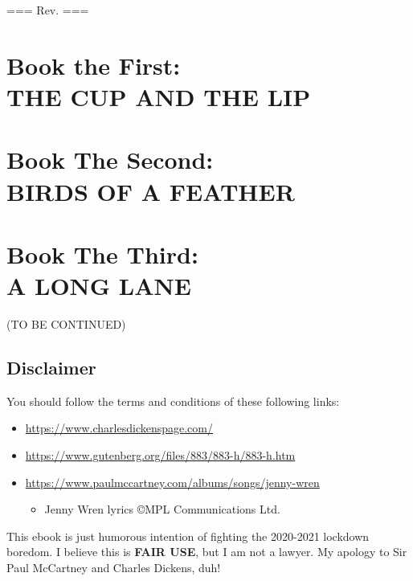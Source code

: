 \documentclass[12pt]{book}
\begin{document}
\noindent
=== Rev. \rev ===

\newpage


\part{Book the First:\\THE CUP AND THE LIP}



















\part{Book The Second:\\BIRDS OF A FEATHER}










\part{Book The Third:\\A LONG LANE}





{\LARGE (TO BE CONTINUED)}

\chapter*{Disclaimer}

You should follow the terms and conditions of these following links:
\begin{itemize}
\item \url{https://www.charlesdickenspage.com/}
\item \url{https://www.gutenberg.org/files/883/883-h/883-h.htm}
\item \url{https://www.paulmccartney.com/albums/songs/jenny-wren}
\begin{itemize}
\item Jenny Wren lyrics \copyright MPL Communications Ltd.
\end{itemize}
\end{itemize}

\noindent
This ebook is just humorous intention of fighting the 2020-2021 lockdown boredom.
I believe this is \textbf{FAIR USE}, but I am not a lawyer.
My apology to Sir Paul McCartney and Charles Dickens, duh!

\end{document}
